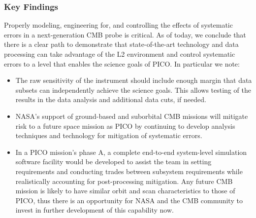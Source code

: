 \documentclass[PICOReport.tex]{subfiles}
\begin{document}
\subsubsection{Key Findings}
Properly modeling, engineering for, and controlling the effects of systematic errors in a
next-generation CMB probe is critical.  As of today, we conclude that there is a clear path to demonstrate that state-of-the-art technology and data processing can take advantage of the L2 environment and control systematic errors to a level that enables the science goals of PICO. In particular we note:
\begin{itemize}
\item The raw sensitivity of the instrument should include enough margin
that data subsets can independently achieve the science goals.
This allows testing of the results in the data analysis and additional
data cuts, if needed.

\item NASA's support of ground-based and suborbital CMB missions will mitigate risk to a future space mission as PICO by continuing to develop analysis techniques and technology for mitigation of systematic errors.

\item In a PICO mission's phase A, a complete end-to-end system-level
simulation software facility would be developed to assist the team in setting 
requirements and conducting trades between subsystem requirements while
realistically accounting for post-processing mitigation.  Any future
CMB mission is likely to have similar orbit  
and scan characteristics to those of PICO, thus there is an opportunity for NASA and
the CMB community to invest in further development of this capability now.
\end{itemize}
\end{document}
